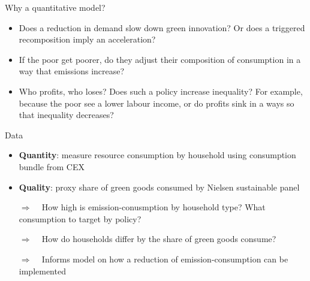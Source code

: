 \documentclass[11pt,aspectratio=169]{beamer}
\newcommand{\ar}{$\Rightarrow$ \ }
\begin{document}
\begin{frame}{Why a quantitative model?}
	\begin{itemize}[<+-| alert@+>]
		
		\item Does a reduction in demand slow down green innovation? Or does a triggered recomposition imply an acceleration?
		\item If the poor get poorer, do
		 they adjust their composition of consumption  in a way that emissions increase?
		\item Who profits, who loses?  Does such a policy increase inequality? For example, because the poor see a lower labour income, or do profits sink in a ways so that inequality decreases?
	\end{itemize}
\end{frame}

\begin{frame}{Data}
	\begin{itemize}[<+-| alert@+>] %
		
		\item \textbf{Quantity}: measure resource consumption by household using consumption bundle from CEX 
		\item \textbf{Quality}: proxy share of green goods consumed by Nielsen sustainable panel
		\item[\ar] How high is emission-conusmption by household type? What consumption to target by policy?
		\item[\ar] How do households differ by the share of green goods consume? 
		\item[\ar] Informs model on how a reduction of emission-consumption can be implemented
	\end{itemize}
\end{frame}
\end{document}
